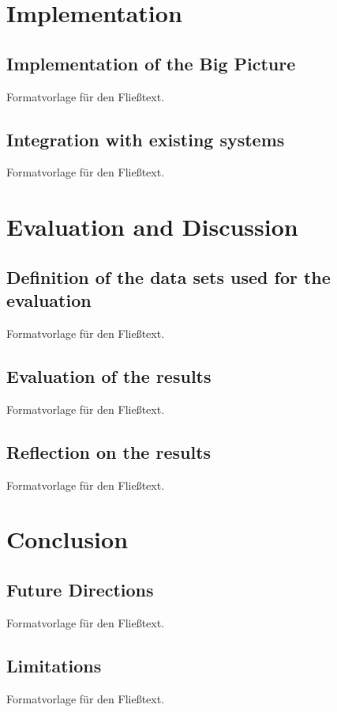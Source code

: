 \documentclass[a4paper,12pt,twoside]{scrreprt}
\begin{document}
\chapter{Implementation}

\section{Implementation of the Big Picture}
Formatvorlage für den Fließtext.

\section{Integration with existing systems}
Formatvorlage für den Fließtext.


\chapter{Evaluation and Discussion}

\section{Definition of the data sets used for the evaluation}
Formatvorlage für den Fließtext.

\section{Evaluation of the results}
Formatvorlage für den Fließtext.

\section{Reflection on the results}
Formatvorlage für den Fließtext.


\chapter{Conclusion}

\section{Future Directions}
Formatvorlage für den Fließtext.

\section{Limitations}
Formatvorlage für den Fließtext.


\clearpage
{}
{}
\printbibliography
\end{document}
